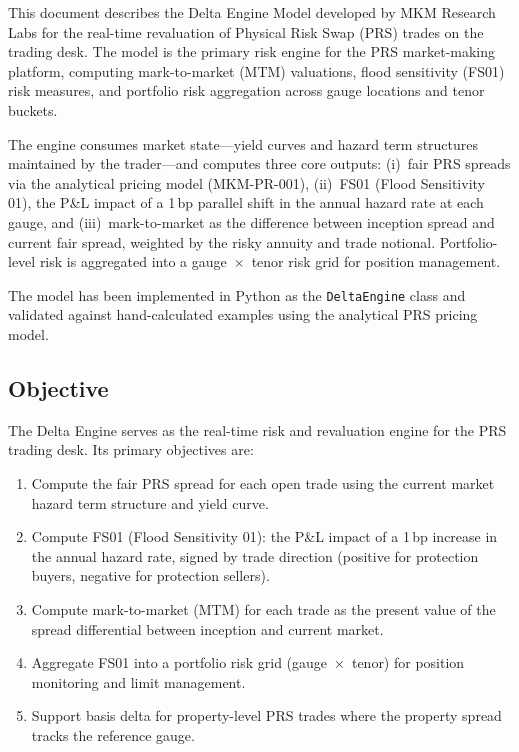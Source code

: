 \documentclass[11pt,a4paper]{article}
\begin{document}
\mkmtitlepage
\mkmlegalpage
\tableofcontents
\clearpage

\mkmexecsummary

This document describes the Delta Engine Model developed by MKM Research Labs for the real-time revaluation of Physical Risk Swap (PRS) trades on the trading desk. The model is the primary risk engine for the PRS market-making platform, computing mark-to-market (MTM) valuations, flood sensitivity (FS01) risk measures, and portfolio risk aggregation across gauge locations and tenor buckets.

The engine consumes market state---yield curves and hazard term structures maintained by the trader---and computes three core outputs: (i)~fair PRS spreads via the analytical pricing model (MKM-PR-001), (ii)~FS01 (Flood Sensitivity 01), the P\&L impact of a 1\,bp parallel shift in the annual hazard rate at each gauge, and (iii)~mark-to-market as the difference between inception spread and current fair spread, weighted by the risky annuity and trade notional. Portfolio-level risk is aggregated into a gauge~$\times$~tenor risk grid for position management.

The model has been implemented in Python as the \texttt{DeltaEngine} class and validated against hand-calculated examples using the analytical PRS pricing model.

\clearpage

\mkmpurpose

\subsection{Objective}

The Delta Engine serves as the real-time risk and revaluation engine for the PRS trading desk. Its primary objectives are:

\begin{enumerate}[label=(\roman*)]
    \item Compute the fair PRS spread for each open trade using the current market hazard term structure and yield curve.
    \item Compute FS01 (Flood Sensitivity 01): the P\&L impact of a 1\,bp increase in the annual hazard rate, signed by trade direction (positive for protection buyers, negative for protection sellers).
    \item Compute mark-to-market (MTM) for each trade as the present value of the spread differential between inception and current market.
    \item Aggregate FS01 into a portfolio risk grid (gauge~$\times$~tenor) for position monitoring and limit management.
    \item Support basis delta for property-level PRS trades where the property spread tracks the reference gauge.
\end{enumerate}
\end{document}
